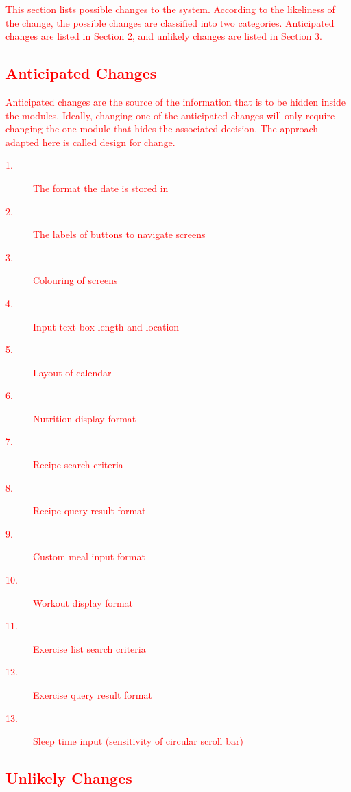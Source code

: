 \documentclass[12pt,letterpaper]{article}
\begin{document}
\textcolor{red}{This section lists possible changes to the system. According to the likeliness
of the change, the possible changes are classified into two
categories. Anticipated changes are listed in Section 2, and
unlikely changes are listed in Section 3.}

\subsection{\textcolor{red}{Anticipated Changes}}

\textcolor{red}{Anticipated changes are the source of the information that is to be hidden
inside the modules. Ideally, changing one of the anticipated changes will only
require changing the one module that hides the associated decision. The approach
adapted here is called design for change.}

\begin{description}
\item[\textcolor{red}{1.}] \textcolor{red}{The format the date is stored in}
\item[\textcolor{red}{2.}] \textcolor{red}{The labels of buttons to navigate screens}
\item[\textcolor{red}{3.}] \textcolor{red}{Colouring of screens}
\item[\textcolor{red}{4.}] \textcolor{red}{Input text box length and location}
\item[\textcolor{red}{5.}] \textcolor{red}{Layout of calendar}
\item[\textcolor{red}{6.}] \textcolor{red}{Nutrition display format}
\item[\textcolor{red}{7.}] \textcolor{red}{Recipe search criteria}
\item[\textcolor{red}{8.}] \textcolor{red}{Recipe query result format}
\item[\textcolor{red}{9.}] \textcolor{red}{Custom meal input format}
\item[\textcolor{red}{10.}] \textcolor{red}{Workout display format}
\item[\textcolor{red}{11.}] \textcolor{red}{Exercise list search criteria}
\item[\textcolor{red}{12.}] \textcolor{red}{Exercise query result format}
\item[\textcolor{red}{13.}] \textcolor{red}{Sleep time input (sensitivity of circular scroll bar)}
\end{description}

\subsection{\textcolor{red}{Unlikely Changes}}
\end{document}
